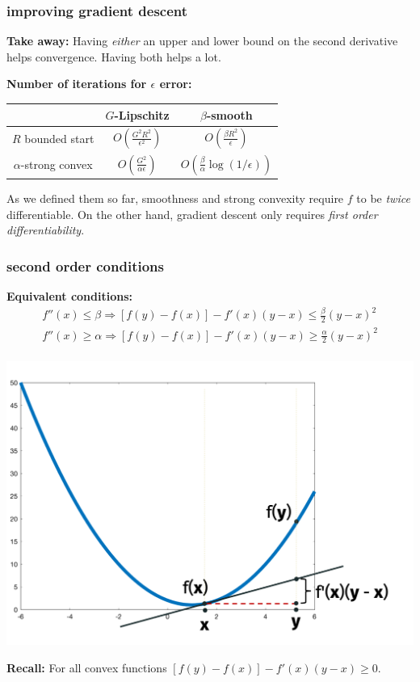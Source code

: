 \documentclass[compress]{beamer}
\begin{document}
\begin{frame}
	\frametitle{improving gradient descent}
	\textbf{Take away:} Having \emph{either} an upper and lower bound on the second derivative helps convergence. Having both helps a lot.

	\textbf{Number of iterations for $\epsilon$ error:}
	\begin{center}
		\begin{tabular}{c|cc}
			& $G$-Lipschitz & $\beta$-smooth   \\ \hline
			$R$ bounded start & $O\left(\frac{G^2R^2}{\epsilon^2}\right)$ & $O\left(\frac{\beta R^2}{\epsilon}\right)$ \\
			$\alpha$-strong convex & $O\left(\frac{G^2}{\alpha\epsilon}\right)$ & $O\left(\frac{\beta}{\alpha}\log(1/\epsilon)\right)$
		\end{tabular}
	\end{center}
	As we defined them so far, smoothness and strong convexity require $f$ to be \emph{twice} differentiable. On the other hand, gradient descent only requires \emph{first order differentiability}.
\end{frame}


\begin{frame}[t]
	\frametitle{second order conditions}
	\textbf{Equivalent conditions:}
	\begin{align*}
		f''(x) \leq \beta \Rightarrow [f(y) - f(x)] - f'(x)(y-x) \leq \frac{\beta}{2}(y-x)^2 \\
		f''(x) \geq \alpha \Rightarrow [f(y) - f(x)] - f'(x)(y-x) \geq \frac{\alpha}{2}(y-x)^2 \\
	\end{align*}
	\vspace{-4.5em}

	\begin{center}
		\includegraphics[width=.6\textwidth]{first_second_cond.png}

		\textbf{Recall:} For all convex functions $[f(y) - f(x)] - f'(x)(y-x) \geq 0$. 
	\end{center}
 \end{frame}
\end{document}
